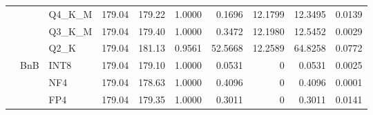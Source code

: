 \begin{longtable}{ll l rrrrrrr}
 &  & Q4\_K\_M & 179.04 & 179.22 & 1.0000 & 0.1696 & 12.1799 & 12.3495 & 0.0139 \\
 &  & Q3\_K\_M & 179.04 & 179.40 & 1.0000 & 0.3472 & 12.1980 & 12.5452 & 0.0029 \\
 &  & Q2\_K & 179.04 & 181.13 & 0.9561 & 52.5668 & 12.2589 & 64.8258 & 0.0772 \\
 & BnB & INT8 & 179.04 & 179.10 & 1.0000 & 0.0531 & \cellcolor{cyan!12} $0$ & 0.0531 & 0.0025 \\
 &  & NF4 & 179.04 & 178.63 & 1.0000 & 0.4096 & \cellcolor{cyan!12} $0$ & 0.4096 & 0.0001 \\
 &  & FP4 & 179.04 & 179.35 & 1.0000 & 0.3011 & \cellcolor{cyan!12} $0$ & 0.3011 & 0.0141 \\
\end{longtable}
\endgroup